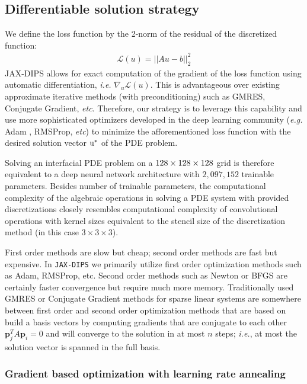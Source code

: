 \documentclass{elsarticle}
\begin{document}
\subsection{Differentiable solution strategy}

We define the loss function by the 2-norm of the residual of the discretized function:
\begin{align*}
	\mathcal{L}(u) = \vert\vert Au - b\vert\vert_2^2
\end{align*}
JAX-DIPS allows for exact computation of the gradient of the loss function using automatic differentiation, \textit{i.e.} $\nabla_u \mathcal{L}(u)$. This is advantageous over existing approximate iterative methods (with preconditioning) such as GMRES, Conjugate Gradient, \textit{etc}. Therefore, our strategy is to leverage this capability and use more sophisticated optimizers developed in the deep learning community (\textit{e.g.} Adam \cite{kingma2014adam}, RMSProp, \textit{etc}) to minimize the afforementioned loss function with the desired solution vector $\rm u^\ast$ of the PDE problem.

Solving an interfacial PDE problem on a $\rm 128\times 128 \times 128$ grid is therefore equivalent to a deep neural network architecture with $2,097,152$ trainable parameters. Besides number of trainable parameters, the computational complexity of the algebraic operations in solving a PDE system with provided discretizations closely resembles computational complexity of convolutional operations with kernel sizes equivalent to the stencil size of the discretization method (in this case $3\times 3 \times 3$).


First order methods are slow but cheap; second order methods are fast but expensive. In \texttt{JAX-DIPS} we primarily utilize first order optimization methods such as Adam, RMSProp, etc. Second order methods such as Newton or BFGS are certainly faster convergence but require much more memory. Traditionally used GMRES or Conjugate Gradient methods for sparse linear systems are somewhere between first order and second order optimization methods that are based on build a basis vectors by computing gradients that are conjugate to each other $\mathbf{p}_j^T A \mathbf{p}_i=0$ and will converge to the solution in at most $n$ steps; \textit{i.e.}, at most the solution vector is spanned in the full basis.


\subsubsection{Gradient based optimization with learning rate annealing}
\end{document}
